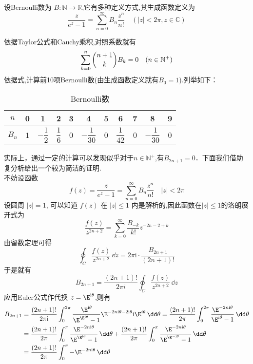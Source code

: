\begin{definition}{}
设Bernoulli数为 $B:\mathbb{N}\to\mathbb{R} $,它有多种定义方式,其生成函数定义为
\begin{equation}{}
    \frac{z}{e^{z}-1}=\sum_{n=0}^{\infty}B_{n}\frac{z^{n}}{n!}
    \quad(|z|<2\pi,z\in{\mathbb C})
\end{equation}
\end{definition}
依据Taylor公式和Cauchy乘积,对照系数就有
\begin{equation}
    \sum_{k=0}^{n}\dbinom{n+1}{k}B_{k}=0\quad(n\in{\mathbb N^{+}})
\end{equation}
依据式,计算前10项Bernoulli数(由生成函数定义就有$B_{0}=1$).列举如下：
\begin{table}[ht]
\centering
\caption{Bernoulli数}
\begin{tabular}{|c|c|c|c|c|c|c|c|c|c|c|}
\hline
$ n $ & 0 & 1 & 2 & 3 & 4 & 5 & 6 & 7 & 8 & 9\\ 
\hline
$ B_{n} $ & $1$ & $-\dfrac{1}{2}$ & $ \dfrac{1}{6}$ & $0$ & $-\dfrac{1}{30}$ & $0$ & $\dfrac{1}{42}$ & $0$ & $-\dfrac{1}{30}$ & $0$\\
\hline
\end{tabular}
\end{table}
实际上，通过一定的计算可以发现似乎对于$n\in\mathbb N^+$,有$B_{2n+1}=0$．下面我们借助复分析给出一个较为简洁的证明.\\
不妨设函数
\[
f(z)=\frac{z}{e^{z}-1}=\sum_{n=0}^{\infty} B_{n} \frac{z^{n}}{n !}\quad |z|<2\pi
\]
设圆周 $|z|=1$, 可以知道 $f(z)$ 在 $|z|\leq 1$ 内是解析的,因此函数在$|z|\leq 1$的洛朗展开式为
\[
\frac{f(z)}{z^{2n+2}}=\sum_{k=0}^{\infty}\frac{B_{-k}}{k!}{z^{-2n-2+k}}
\]
由留数定理可得
\[
\oint_{C}\frac{f(z)}{z^{2 n+2}}\,\dd z=2\pi\mathrm i\cdot\frac{B_{2 n+1}}{(2n+1)!}
\]
于是就有
\[
B_{2n+1}=\frac{(2n+1) !}{2 \pi i}\oint_{C} \frac{f(z)}{z^{2 n+2}}\,\dd z
\]
应用Euler公式作代换 $z=\E^{\mathrm i\theta}$,则有
$$
\begin{aligned}
B_{2n+1}&=\frac{(2n+1)!}{2\pi\mathrm i}\int_{0}^{2\pi}\frac{\E^{\mathrm i\theta}}{\E^{\E^{\mathrm i\theta}}-1}\E^{-2n\mathrm i\theta-2\mathrm i\theta}\mathrm i\E^{i \theta}\,\dd\theta
=\frac{(2n+1)!}{2\pi}\int_{0}^{2\pi}\frac{\E^{-2n\mathrm i\theta}}{\E^{\mathrm i\theta}-1}\,\dd\theta\\
&=\frac{(2n+1)!}{2\pi}\int_{0}^{\pi}\frac{\E^{-2n\mathrm i\theta}}{\E^{\E^{\mathrm i\theta}}-1}\,\dd \theta+\frac{(2n+1)!}{2\pi}\int_{0}^{\pi} \frac{\E^{-2n\mathrm i\theta}}{\E^{\E^{-\mathrm i\theta}}-1}\,\dd \theta\\
&=\frac{(2 n+1)!}{2\pi}\int_{0}^{\pi}-\E^{-2n\mathrm i\theta}\,\dd\theta
\end{aligned}
$$
